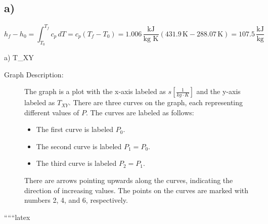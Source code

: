 

\subsection*{a)}

\[
h_f - h_0 = \int_{T_0}^{T_f} c_p \, dT = c_p (T_f - T_0) = 1.006 \, \frac{\text{kJ}}{\text{kg K}} (431.9 \, \text{K} - 288.07 \, \text{K}) = 107.5 \, \frac{\text{kJ}}{\text{kg}}
\]

a) \quad T_{XY}

\begin{description}
    \item[Graph Description:] 
    The graph is a plot with the x-axis labeled as \( s \left[ \frac{1}{kg \cdot K} \right] \) and the y-axis labeled as \( T_{XY} \). There are three curves on the graph, each representing different values of \( P \). The curves are labeled as follows:
    \begin{itemize}
        \item The first curve is labeled \( P_0 \).
        \item The second curve is labeled \( P_1 = P_0 \).
        \item The third curve is labeled \( P_2 = P_1 \).
    \end{itemize}
    There are arrows pointing upwards along the curves, indicating the direction of increasing values. The points on the curves are marked with numbers 2, 4, and 6, respectively.
\end{description}

``````latex